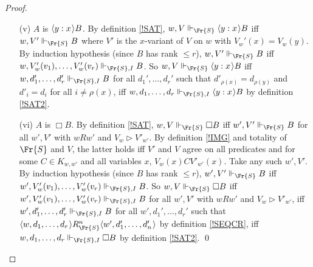 \documentclass[11pt]{woarticle}
\theoremstyle{break}
\theoremstyle{nonumberplain}
\newcommand{\SAT}{\Vdash}
\newcommand{\Img}{\triangleright}
\newcommand{\1}{\;\,|\;\,}
\renewcommand{\t}[1]{\ensuremath{\langle #1  \makebox[.2ex]{}\rangle}}
\begin{document}
\begin{proof}
\begin{itemize}
  \item[(v)] $A$ is $\t{y:x} B$. By definition \ref{!SAT}, $w,V
    \SAT_{\Fr{S}} \t{y:x} B$ iff $w,V'\SAT_{\Fr{S}} B$ where $V'$ is
    the $x$-variant of $V$ on $w$ with $V_w'(x)=V_w(y)$. By induction
    hypothesis (since $B$ has rank $\leq r$), $w,V' \SAT_{\Fr{S}} B$
    iff $w,V_w'(v_1),\ldots,V_w'(v_r) \SAT_{\Fr{S},I} B$. So $w,V
    \SAT_{\Fr{S}} \t{y:x} B$ iff $w,d_1',\ldots,d_r' \SAT_{\Fr{S},I}
    B$ for all $d_1',\ldots,d_r'$ such that $d'_{\rho(x)} =
    d_{\rho(y)}$ and $d'_i = d_i$ for all $i\not=\rho(x)$, iff
    $w,d_1,\ldots,d_r \SAT_{\Fr{S},I} \t{y:x}B$ by definition
    \ref{!SAT2}.

  \item[(vi)] $A$ is $\Box B$. By definition \ref{!SAT}, $w,V
    \SAT_{\Fr{S}} \Box B$ iff $w',V' \SAT_{\Fr{S}} B$ for all $w',V'$
    with $wRw'$ and $V_w \Img V'_{w'}$. By definition \ref{!IMG} and
    totality of $\Fr{S}$ and $V$, the latter holds iff $V'$ and $V$
    agree on all predicates and for some $C\in K_{w,w'}$ and all
    variables $x$, $V_w(x)C V'_{w'}(x)$. Take any such $w',V'$. By
    induction hypothesis (since $B$ has rank $\leq r$), $w',V'
    \SAT_{\Fr{S}} B$ iff $w',V_w'(v_1),\ldots,V_w'(v_r)
    \SAT_{\Fr{S},I} B$. So $w,V \SAT_{\Fr{S}} \Box B$ iff
    $w',V_w'(v_1),\ldots,V_w'(v_r) \SAT_{\Fr{S},I} B$ for all $w',V'$
    with $wRw'$ and $V_w\Img V'_{w'}$, iff $w',d_1',\ldots,d_r'
    \SAT_{\Fr{S},I} B$ for all $w',d_1',\ldots,d_r'$ such that
    $\t{w,d_1,\ldots,d_r} R^n_{\Fr{S}} \t{w',d_1',\ldots,d_n'}$ by definition
    \ref{!SEQCR}, iff $w,d_1,\ldots,d_r \SAT_{\Fr{S},I} \Box B$ by
    definition \ref{!SAT2}. \qed
  \end{itemize}
\end{proof}
\end{document}
